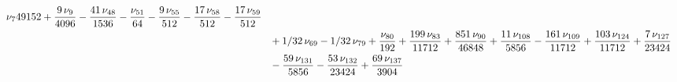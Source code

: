 \documentclass[a4paper,12pt, DIV=14, BCOR=5mm, twoside, headsepline, numbers=noenddot]{scrbook}
\begin{document}
\begin{align}
\begin{aligned}
{{\nu_{{7}}}{49152}}+{\frac {9\,\nu_{{9}}}{4096}}-{\frac {41\,\nu_{{48}}
}{1536}}-{\frac {\nu_{{51}}}{64}}-{\frac {9\,\nu_{{55}}}{512}}-{\frac 
{17\,\nu_{{58}}}{512}}-{\frac {17\,\nu_{{59}}}{512}}\\
 &\hphantom{=}+1/32\,\nu_{{69}}-
1/32\,\nu_{{79}}+{\frac {\nu_{{80}}}{192}}+{\frac {199\,\nu_{{83}}}{
11712}}+{\frac {851\,\nu_{{90}}}{46848}}+{\frac {11\,\nu_{{108}}}{5856
}}-{\frac {161\,\nu_{{109}}}{11712}}+{\frac {103\,\nu_{{124}}}{11712}}
+{\frac {7\,\nu_{{127}}}{23424}}\\
 &\hphantom{=}-{\frac {59\,\nu_{{131}}}{5856}}-{
\frac {53\,\nu_{{132}}}{23424}}+{\frac {69\,\nu_{{137}}}{3904}}
\end{aligned}
\end{align}


\printbibliography[
heading=bibintoc,
title={Bibliography}
]

\printunsrtglossaries
\end{document}
